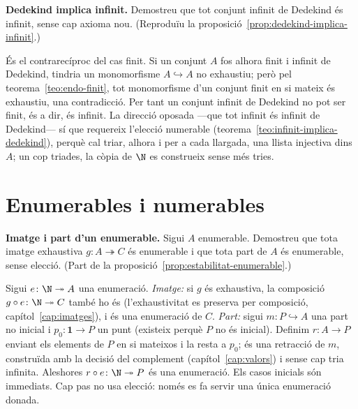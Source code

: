 \begin{exercici}
\textbf{Dedekind implica infinit.} Demostreu que tot conjunt infinit de Dedekind és infinit, sense cap axioma nou. (Reproduïu la proposició~\ref{prop:dedekind-implica-infinit}.)
\end{exercici}
\begin{solucio}
És el contrarecíproc del cas finit. Si un conjunt \(A\) fos alhora finit i infinit de Dedekind, tindria un monomorfisme \(A\hookrightarrow A\) no exhaustiu; però pel teorema~\ref{teo:endo-finit}, tot monomorfisme d'un conjunt finit en si mateix és exhaustiu, una contradicció. Per tant un conjunt infinit de Dedekind no pot ser finit, és a dir, és infinit. La direcció oposada ---que tot infinit és infinit de Dedekind--- sí que requereix l'elecció numerable (teorema~\ref{teo:infinit-implica-dedekind}), perquè cal triar, alhora i per a cada llargada, una llista injectiva dins \(A\); un cop triades, la còpia de \(\N\) es construeix sense més tries.
\end{solucio}

\section{Enumerables i numerables}\label{prac:enumerables}

\begin{exercici}
\textbf{Imatge i part d'un enumerable.} Sigui \(A\) enumerable. Demostreu que tota imatge exhaustiva \(g\colon A\twoheadrightarrow C\) és enumerable i que tota part de \(A\) és enumerable, sense elecció. (Part de la proposició~\ref{prop:estabilitat-enumerable}.)
\end{exercici}
\begin{solucio}
Sigui \(e\colon\N\twoheadrightarrow A\) una enumeració. \emph{Imatge:} si \(g\) és exhaustiva, la composició \(g\circ e\colon\N\twoheadrightarrow C\) també ho és (l'exhaustivitat es preserva per composició, capítol~\ref{cap:imatges}), i és una enumeració de \(C\). \emph{Part:} sigui \(m\colon P\hookrightarrow A\) una part no inicial i \(p_0\colon\mathbf1\to P\) un punt (existeix perquè \(P\) no és inicial). Definim \(r\colon A\to P\) enviant els elements de \(P\) en si mateixos i la resta a \(p_0\); és una retracció de \(m\), construïda amb la decisió del complement (capítol~\ref{cap:valors}) i sense cap tria infinita. Aleshores \(r\circ e\colon\N\twoheadrightarrow P\) és una enumeració. Els casos inicials són immediats. Cap pas no usa elecció: només es fa servir una única enumeració donada.
\end{solucio}

